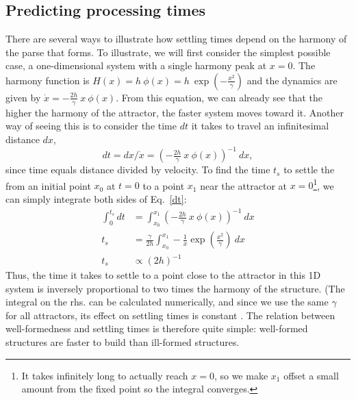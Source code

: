 \documentclass[10pt,letterpaper]{article}
\begin{document}
\subsection{Predicting processing times}
There are several ways to illustrate how settling times depend on the harmony of the parse that forms. To illustrate, we will first consider the simplest possible case, a one-dimensional system with a single harmony peak at $x = 0$. The harmony function is $H(x) = h~\phi(x) = h~\exp\left(-\tfrac{x^2}{\gamma} \right)$ and the dynamics are given by $\dot{x} = -\tfrac{2h}{\gamma}~x~\phi(x)$.
From this equation, we can already see that the higher the harmony of the attractor, the faster system moves toward it. Another way of seeing this is to consider the time $dt$ it takes to travel an infinitesimal distance $dx$,
\begin{equation}\label{dt}
dt  = dx/\dot{x} = \left(-\tfrac{2h}{\gamma}~x~\phi(x)\right)^{-1}~dx,
\end{equation}
since time equals distance divided by velocity. To find the time $t_s$ to settle the from an initial point $x_0$ at $t = 0$ to a point $x_1$ near the attractor at $x = 0$\footnote{It takes infinitely long to actually reach $x = 0$, so we make $x_1$ offset a small amount from the fixed point so the integral converges.}, we can simply integrate both sides of Eq.~\ref{dt}:
\begin{align}\label{ts}
\int_{0}^{t_s} dt & = \int_{x_0}^{x_1} \left(-\tfrac{2h}{\gamma}~x~\phi(x)\right)^{-1}~dx \nonumber \\
t_s & = \tfrac{\gamma}{2h} \int_{x_0}^{x_1} -\frac{1}{x}\exp\left(\tfrac{x^2}{\gamma} \right)~dx \nonumber \\
t_s & \propto (2h)^{-1}
\end{align}
Thus, the time it takes to settle to a point close to the attractor in this 1D system is inversely proportional to two times the harmony of the structure. (The integral on the rhs. can be calculated numerically, and since we use the same $\gamma$ for all attractors, its effect on settling times is constant%
. The relation between well-formedness and settling times is therefore quite simple: well-formed structures are faster to build than ill-formed structures.
\end{document}
